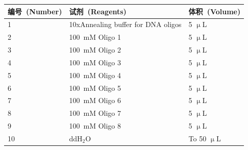 \begin{table}[!ht]
\centering
{
\par}
\small
\begin{tabular*}{\textwidth}[c]{@{\extracolsep{\fill}}lll}
\toprule
编号\ (Number) & 试剂\ (Reagents) & 体积\ (Volume)\\
\midrule
1 & 10xAnnealing buffer for DNA oligos & 5 $\upmu$L\\
2 & \SI{100}{\milli\nauticalmile} Oligo 1 & 5 $\upmu$L\\
3 & \SI{100}{\milli\nauticalmile} Oligo 2 & 5 $\upmu$L\\
4 & \SI{100}{\milli\nauticalmile} Oligo 3 & 5 $\upmu$L\\
5 & \SI{100}{\milli\nauticalmile} Oligo 4 & 5 $\upmu$L\\
6 & \SI{100}{\milli\nauticalmile} Oligo 5 & 5 $\upmu$L\\
7 & \SI{100}{\milli\nauticalmile} Oligo 6 & 5 $\upmu$L\\
8 & \SI{100}{\milli\nauticalmile} Oligo 7 & 5 $\upmu$L\\
9 & \SI{100}{\milli\nauticalmile} Oligo 8 & 5 $\upmu$L\\
10& ddH$_2$O  & To 50 $\upmu$L\\
\bottomrule
\end{tabular*}
\end{table}

